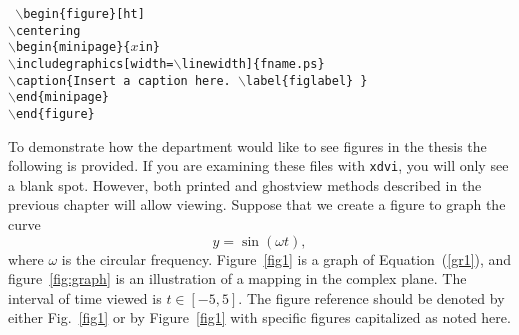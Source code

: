 \texttt{ \hspace*{0.5in} $\backslash$begin\{figure\}[ht]
  \\
  \hspace*{0.75in} $\backslash$centering
  \\
  \hspace*{0.75in} $\backslash$begin\{minipage\}\{$x$in\}
  \\
  \hspace*{1.0in}
  $\backslash$includegraphics[width=$\backslash$linewidth]\{fname.ps\}
  \\
  \hspace*{1.0in} $\backslash$caption\{Insert a caption
  here. $\backslash$label\{figlabel\} \}
  \\
  \hspace*{0.75in} $\backslash$end\{minipage\}
  \\
  \hspace*{0.5in} $\backslash$end\{figure\} }

To demonstrate how the department would like to see figures in the
thesis the following is provided. If you are examining these files
with \texttt{xdvi}, you will only see a blank spot. However, both
printed and ghostview methods described in the previous chapter will
allow viewing.  Suppose that we create a figure to graph the curve
\begin{equation}
  y=\sin(\omega t), \label{gr1}
\end{equation}
where $\omega$ is the circular frequency.  Figure~\ref{fig1} is a
graph of Equation~(\ref{gr1}), and figure~\ref{fig:graph} is an
illustration of a mapping in the complex plane. The interval of time
viewed is $t \in [-5,5]$. The figure reference should be denoted by
either Fig.~\ref{fig1} or by Figure~\ref{fig1} with specific figures
capitalized as noted here.

